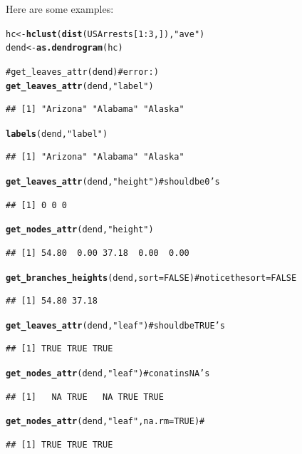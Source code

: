 \documentclass[shortnames,nojss,article]{jss}\usepackage{graphicx, color}
\makeatletter
\newcommand{\hlfunctioncall}[1]{\textcolor[rgb]{0.501960784313725,0,0.329411764705882}{\textbf{#1}}}%
\newcommand{\hlstring}[1]{\textcolor[rgb]{0.6,0.6,1}{#1}}%
\newcommand{\hlcomment}[1]{\textcolor[rgb]{0.180392156862745,0.6,0.341176470588235}{#1}}%
\newenvironment{kframe}{%
 \def\at@end@of@kframe{}%
 \ifinner\ifhmode%
  \def\at@end@of@kframe{\end{minipage}}%
  \begin{minipage}{\columnwidth}%
 \fi\fi%
 \def\FrameCommand##1{\hskip\@totalleftmargin \hskip-\fboxsep
 \colorbox{shadecolor}{##1}\hskip-\fboxsep
     \hskip-\linewidth \hskip-\@totalleftmargin \hskip\columnwidth}%
 \MakeFramed {\advance\hsize-\width
   \@totalleftmargin\z@ \linewidth\hsize
   \@setminipage}}%
 {\par\unskip\endMakeFramed%
 \at@end@of@kframe}
\newenvironment{knitrout}{}{} %
\makeatother
\begin{document}
Here are some examples:

\begin{knitrout}
\color{fgcolor}\begin{kframe}
\begin{alltt}
hc <- \hlfunctioncall{hclust}(\hlfunctioncall{dist}(USArrests[1:3, ]), \hlstring{"ave"})
dend <- \hlfunctioncall{as.dendrogram}(hc)

\hlcomment{# get_leaves_attr(dend) # error :)}
\hlfunctioncall{get_leaves_attr}(dend, \hlstring{"label"})
\end{alltt}
\begin{verbatim}
## [1] "Arizona" "Alabama" "Alaska"
\end{verbatim}
\begin{alltt}
\hlfunctioncall{labels}(dend, \hlstring{"label"})
\end{alltt}
\begin{verbatim}
## [1] "Arizona" "Alabama" "Alaska"
\end{verbatim}
\begin{alltt}

\hlfunctioncall{get_leaves_attr}(dend, \hlstring{"height"})  # should be 0's
\end{alltt}
\begin{verbatim}
## [1] 0 0 0
\end{verbatim}
\begin{alltt}
\hlfunctioncall{get_nodes_attr}(dend, \hlstring{"height"})
\end{alltt}
\begin{verbatim}
## [1] 54.80  0.00 37.18  0.00  0.00
\end{verbatim}
\begin{alltt}
\hlfunctioncall{get_branches_heights}(dend, sort = FALSE)  \hlcomment{# notice the sort=FALSE}
\end{alltt}
\begin{verbatim}
## [1] 54.80 37.18
\end{verbatim}
\begin{alltt}


\hlfunctioncall{get_leaves_attr}(dend, \hlstring{"leaf"})  # should be TRUE's
\end{alltt}
\begin{verbatim}
## [1] TRUE TRUE TRUE
\end{verbatim}
\begin{alltt}
\hlfunctioncall{get_nodes_attr}(dend, \hlstring{"leaf"})  # conatins NA's
\end{alltt}
\begin{verbatim}
## [1]   NA TRUE   NA TRUE TRUE
\end{verbatim}
\begin{alltt}
\hlfunctioncall{get_nodes_attr}(dend, \hlstring{"leaf"}, na.rm = TRUE)  #
\end{alltt}
\begin{verbatim}
## [1] TRUE TRUE TRUE
\end{verbatim}
\begin{alltt}



\end{alltt}
\end{kframe}
\end{knitrout}
\end{document}
